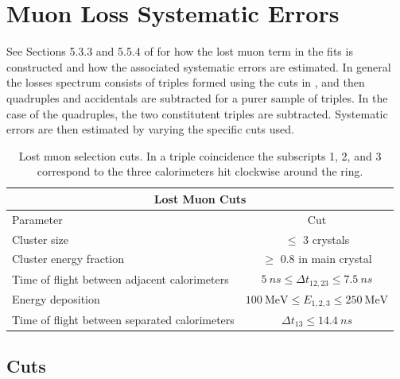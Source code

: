 
\graphicspath{{Body/Figures/MuonLosses/}}

\section{Muon Loss Systematic Errors}


See Sections 5.3.3 and 5.5.4 of  for how the lost muon term in the fits is constructed and how the associated systematic errors are estimated. In general the losses spectrum consists of triples formed using the cuts in , and then quadruples and accidentals are subtracted for a purer sample of triples. In the case of the quadruples, the two constitutent triples are subtracted. Systematic errors are then estimated by varying the specific cuts used.


\begin{table}[]
\centering
\setlength\tabcolsep{10pt}
\renewcommand{\arraystretch}{1.2}
\begin{tabular*}{1\linewidth}{@{\extracolsep{\fill}}lc}
  \hline
    \multicolumn{2}{c}{\textbf{Lost Muon Cuts}} \\
  \hline\hline
    Parameter & Cut \\
  \hline
    Cluster size & $\leq$ 3 crystals \\
    Cluster energy fraction & $\geq$ 0.8 in main crystal \\
    Time of flight between adjacent calorimeters & $\SI{5}{ns} \leq \Delta t_{12, 23} \leq \SI{7.5}{ns}$ \\
    Energy deposition & $\SI{100}{\MeV} \leq E_{1,2,3} \leq \SI{250}{\MeV}$ \\
    Time of flight between separated calorimeters & $\Delta t_{13} \leq \SI{14.4}{ns}$ \\
  \hline 
\end{tabular*}
\caption[Lost muon cuts]{Lost muon selection cuts. In a triple coincidence the subscripts 1, 2, and 3 correspond to the three calorimeters hit clockwise around the ring.}
\label{tab:lostmuoncuts}
\end{table}



\subsection{Cuts}


